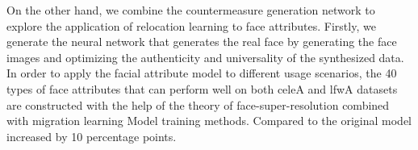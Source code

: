 {On the other hand, we combine the countermeasure generation network to explore the application of relocation learning to face attributes. Firstly, we generate the neural network that generates the real face by generating the face images and optimizing the authenticity and universality of the synthesized data. In order to apply the facial attribute model to different usage scenarios, the 40 types of face attributes that can perform well on both celeA and lfwA datasets are constructed with the help of the theory of face-super-resolution combined with migration learning Model training methods. Compared to the original model increased by 10 percentage points.

}


